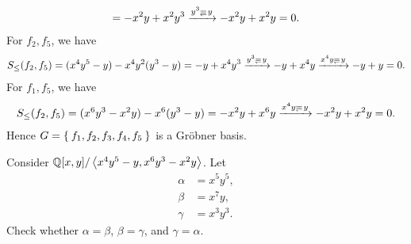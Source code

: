 \begin{example}
\begin{align*}
    =-x^2y+x^2y^3
    \xrightarrow{y^3\Denotes y}
    -x^2y+x^2y=0.
  \end{align*}
  For $f_2,f_5$, we have
  \begin{align*}
    S_{\leq}(f_2,f_5)=
    (x^4y^5-y)
    -x^4y^2(y^3-y)
    =-y+x^4y^3
\xrightarrow{y^3\Denotes y}
    -y+x^4y
\xrightarrow{x^4y\Denotes y}
    -y+y=0.
  \end{align*}
  For $f_1,f_5$, we have
  \begin{align*}
    S_{\leq}(f_2,f_5)=
    (x^6y^3-x^2y)
    -x^6(y^3-y)
    =-x^2y+x^6y
\xrightarrow{x^4y\Denotes y}
-x^2y+x^2y=0.
  \end{align*}
Hence   
$G=\Set{f_1,f_2,f_3,f_4,f_5}$ is
a Gr\"obner basis.
\end{example}

\begin{quiz}
  Consider $\mathbb{Q}[x,y]/\Braket{x^4y^5-y,x^6y^3-x^2y}$.
  Let
  \begin{align*}
    \alpha &= x^5y^5,\\
    \beta &= x^7y,\\
    \gamma &= x^3y^3.
  \end{align*}
  Check whether $\alpha=\beta$, $\beta=\gamma$,
  and $\gamma=\alpha$.
\end{quiz}
